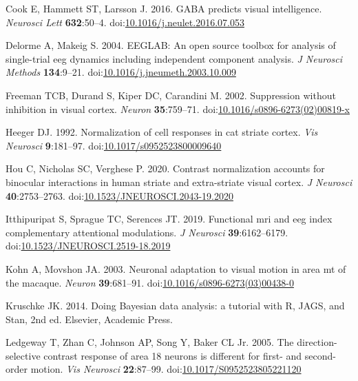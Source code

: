 \documentclass[]{article}
\begin{document}
\leavevmode\hypertarget{ref-Cook2016}{}%
Cook E, Hammett ST, Larsson J. 2016. GABA predicts visual intelligence. \emph{Neurosci Lett} \textbf{632}:50--4. doi:\href{https://doi.org/10.1016/j.neulet.2016.07.053}{10.1016/j.neulet.2016.07.053}

\leavevmode\hypertarget{ref-Delorme2004}{}%
Delorme A, Makeig S. 2004. EEGLAB: An open source toolbox for analysis of single-trial eeg dynamics including independent component analysis. \emph{J Neurosci Methods} \textbf{134}:9--21. doi:\href{https://doi.org/10.1016/j.jneumeth.2003.10.009}{10.1016/j.jneumeth.2003.10.009}

\leavevmode\hypertarget{ref-Freeman2002}{}%
Freeman TCB, Durand S, Kiper DC, Carandini M. 2002. Suppression without inhibition in visual cortex. \emph{Neuron} \textbf{35}:759--71. doi:\href{https://doi.org/10.1016/s0896-6273(02)00819-x}{10.1016/s0896-6273(02)00819-x}

\leavevmode\hypertarget{ref-Heeger1992}{}%
Heeger DJ. 1992. Normalization of cell responses in cat striate cortex. \emph{Vis Neurosci} \textbf{9}:181--97. doi:\href{https://doi.org/10.1017/s0952523800009640}{10.1017/s0952523800009640}

\leavevmode\hypertarget{ref-Hou2020}{}%
Hou C, Nicholas SC, Verghese P. 2020. Contrast normalization accounts for binocular interactions in human striate and extra-striate visual cortex. \emph{J Neurosci} \textbf{40}:2753--2763. doi:\href{https://doi.org/10.1523/JNEUROSCI.2043-19.2020}{10.1523/JNEUROSCI.2043-19.2020}

\leavevmode\hypertarget{ref-Itthipuripat2019}{}%
Itthipuripat S, Sprague TC, Serences JT. 2019. Functional mri and eeg index complementary attentional modulations. \emph{J Neurosci} \textbf{39}:6162--6179. doi:\href{https://doi.org/10.1523/JNEUROSCI.2519-18.2019}{10.1523/JNEUROSCI.2519-18.2019}

\leavevmode\hypertarget{ref-Kohn2003}{}%
Kohn A, Movshon JA. 2003. Neuronal adaptation to visual motion in area mt of the macaque. \emph{Neuron} \textbf{39}:681--91. doi:\href{https://doi.org/10.1016/s0896-6273(03)00438-0}{10.1016/s0896-6273(03)00438-0}

\leavevmode\hypertarget{ref-Kruschke2014}{}%
Kruschke JK. 2014. Doing Bayesian data analysis: a tutorial with R, JAGS, and Stan, 2nd ed. Elsevier, Academic Press.

\leavevmode\hypertarget{ref-Ledgeway2005}{}%
Ledgeway T, Zhan C, Johnson AP, Song Y, Baker CL Jr. 2005. The direction-selective contrast response of area 18 neurons is different for first- and second-order motion. \emph{Vis Neurosci} \textbf{22}:87--99. doi:\href{https://doi.org/10.1017/S0952523805221120}{10.1017/S0952523805221120}
\end{document}
